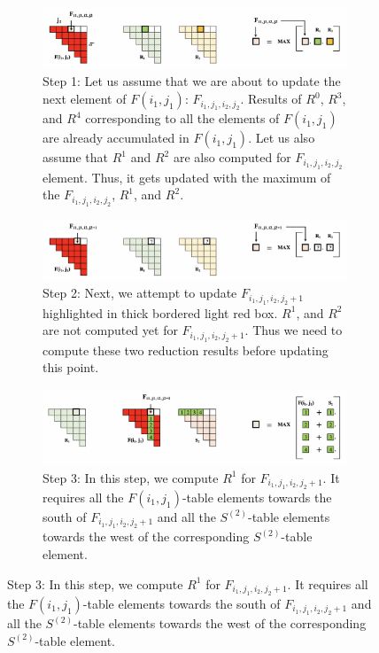 \begin{figure}[htbp]
\centering
\begin{subfigure}[htbp]{1\linewidth}
\centering
\includegraphics[scale=0.35, trim=4 4 4 4,clip]{content/figures/r0_r1_1.png}
\caption{Step 1: Let us assume that we are about to update the next element of $F(i_{1}, j_{1})$: $F_{i_{1}, j_{1}, i_{2}, j_{2}}$. Results of $R^{0}$, $R^{3}$, and $R^{4}$ corresponding to all the elements of $F(i_{1}, j_{1})$ are already accumulated in $F(i_{1}, j_{1})$. Let us also assume that  $R^{1}$ and $R^{2}$ are also computed for $F_{i_{1}, j_{1}, i_{2}, j_{2}}$ element. Thus, it gets updated with the maximum of the $F_{i_{1}, j_{1}, i_{2}, j_{2}}$,  $R^{1}$, and $R^{2}$.}
\label{fig:r3_r4_1}
\end{subfigure}
\begin{subfigure}[htbp]{1\linewidth}
\centering
\includegraphics[scale=0.35, trim=4 4 4 4,clip]{content/figures/r0_r1_2.png}
\caption{Step 2: Next, we attempt to update $F_{i_{1}, j_{1}, i_{2}, j_{2} +1}$ highlighted in thick bordered light red box. 
$R^{1}$, and $R^{2}$ are not computed yet for $F_{i_{1}, j_{1}, i_{2}, j_{2} +1}$. Thus we need to compute these two reduction results before updating this point.}
\label{fig:r3_r4_2}
\end{subfigure}

\begin{subfigure}[htbp]{1\linewidth}
\centering
\includegraphics[scale=0.35, trim=4 4 4 4,clip]{content/figures/r0_r1_3.png}
\caption{Step 3: In this step, we compute  $R^{1}$ for $F_{i_1, j_1, i_2, j_2+1}$. It requires all the $F(i_1, j_1)$-table elements towards the south of $F_{i_1, j_1, i_2, j_2+1}$ and all the $S^{(2)}$-table elements towards the west of the corresponding $S^{(2)}$-table element.}
\label{fig:r3_r4_3}
\end{subfigure}



\end{figure}
